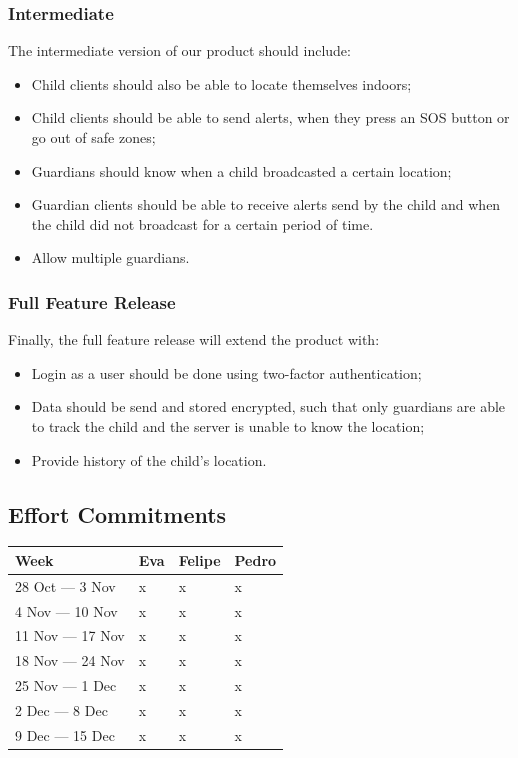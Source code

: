 \documentclass[a4paper]{article}
\begin{document}
\subsubsection{Intermediate}
The intermediate version of our product should include:
\begin{itemize}
    \item Child clients should also be able to locate themselves indoors;
    \item Child clients should be able to send alerts, when they press an SOS button or go out of
        safe zones;
    \item Guardians should know when a child broadcasted a certain location;
    \item Guardian clients should be able to receive alerts send by the child and when the child did
        not broadcast for a certain period of time.
    \item Allow multiple guardians.
\end{itemize}

\subsubsection{Full Feature Release}
Finally, the full feature release will extend the product with:
\begin{itemize}
    \item Login as a user should be done using two-factor authentication;
    \item Data should be send and stored encrypted, such that only guardians are able to track the
        child and the server is unable to know the location;
    \item Provide history of the child's location.
\end{itemize}

\subsection{Effort Commitments}
\begin{center}
\begin{tabular}{llll}
    \toprule
    Week & Eva & Felipe & Pedro\\ \toprule
    28 Oct --- 3 Nov & x & x & x\\\midrule
    4 Nov --- 10 Nov & x & x & x\\\midrule
    11 Nov --- 17 Nov & x & x & x\\\midrule
    18 Nov --- 24 Nov & x & x & x\\\midrule
    25 Nov --- 1 Dec & x & x & x\\\midrule
    2 Dec --- 8 Dec & x & x & x\\\midrule
    9 Dec --- 15 Dec & x & x & x\\\bottomrule
\end{tabular}
\end{center}
\end{document}
